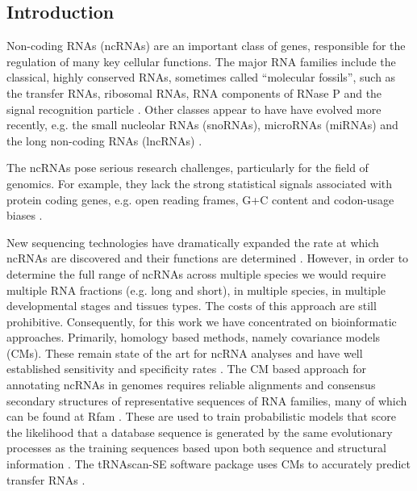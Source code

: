 \documentclass[10pt]{bmc_article}
\newenvironment{bmcformat}{\begin{raggedright}\baselineskip20pt\sloppy\setboolean{publ}{false}}{\end{raggedright}\baselineskip20pt\sloppy}
\begin{document}
\begin{bmcformat}

\section*{Introduction}

Non-coding RNAs (ncRNAs) are an important class of genes, responsible
for the regulation of many key cellular functions. The major RNA
families include the classical, highly conserved RNAs, sometimes
called ``molecular fossils'', such as the transfer RNAs, ribosomal
RNAs, RNA components of RNase P and the signal recognition particle
\cite{Jeffares:1998}. Other classes appear to have have evolved more
recently, e.g. the small nucleolar RNAs (snoRNAs), microRNAs (miRNAs)
and the long non-coding RNAs (lncRNAs) \cite{Hoeppner:2012}.


The ncRNAs pose serious research challenges, particularly for the
field of genomics. For example, they lack the strong statistical
signals associated with protein coding genes, e.g. open reading
frames, G+C content and codon-usage biases \cite{Rivas:2000}. 

New sequencing technologies have dramatically expanded the rate at
which ncRNAs are discovered and their functions are determined
\cite{cech2014noncoding}. However, in order to determine the full
range of ncRNAs across multiple species we would require multiple RNA
fractions (e.g. long and short), in multiple species, in multiple
developmental stages and tissues types. The costs of this approach are
still prohibitive. Consequently, for this work we have concentrated on
bioinformatic approaches. Primarily, homology based methods, namely
covariance models (CMs). These remain state of the art for ncRNA
analyses \cite{Sakakibara:1994,Eddy:1994,Nawrocki:2009} and have well
established sensitivity and specificity rates \cite{Freyhult:2007}.
The CM based approach for annotating ncRNAs in genomes requires
reliable alignments and consensus secondary structures of
representative sequences of RNA families, many of which can be found
at Rfam
\cite{Griffiths-Jones:2003,Griffiths-Jones:2005,Gardner:2009,Gardner:2011a,Burge:2013}. These
are used to train probabilistic models that score the likelihood that
a database sequence is generated by the same evolutionary processes as
the training sequences based upon both sequence and structural
information \cite{Sakakibara:1994,Eddy:1994,Nawrocki:2009}.  The
tRNAscan-SE software package uses CMs to accurately predict transfer
RNAs \cite{Lowe:1997,Chan:2009}.


\end{bmcformat}
\end{document}
